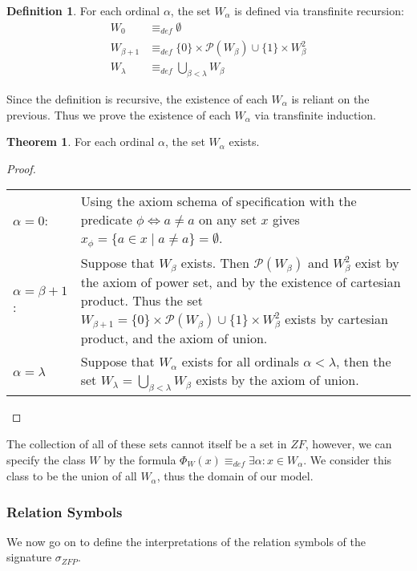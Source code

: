 \documentclass[11pt]{article}
\newcommand{\eqdef}{\equiv_\mathit{def}}
\theoremstyle{definition}
\theoremstyle{theorem}
\theoremstyle{lemma}
\newtheorem{definition}{Definition}[section]
\newtheorem{theorem}{Theorem}[section]
\begin{document}
\begin{definition} For each ordinal $\alpha$, the set $W_\alpha$ is defined via transfinite recursion:
\begin{align*}
 W_0 &\eqdef \emptyset\\
 W_{\beta+1} &\eqdef \{0\}\times\mathcal{P}(W_\beta) \cup \{1\}\times W_\beta^2 \\
 W_\lambda &\eqdef \bigcup_{\beta < \lambda} W_\beta
\end{align*}
\end{definition}
\noindent
Since the definition is recursive, the existence of each $W_\alpha$ is reliant on the previous. Thus we prove the existence of each $W_\alpha$ via transfinite induction.

\begin{theorem} For each ordinal $\alpha$, the set $W_\alpha$ exists.
  \begin{proof} \hspace\\
    \begin{tabular}{p{20mm} p{10cm}}
      $\alpha = 0$: \rule{0pt}{4ex} &
      Using the axiom schema of specification with the predicate $\phi \Leftrightarrow a \neq a$ on any set $x$ gives $x_\phi = \{a \in x \mid a \neq a \} = \emptyset$. \\
      $\alpha = \beta+1$: \rule{0pt}{4ex} &
      Suppose that $W_\beta$ exists. Then $\mathcal{P}(W_\beta)$ and $W_\beta^2$ exist by the axiom of power set, and by the existence of cartesian product. Thus the set $W_{\beta+1} = \{0\}\times\mathcal{P}(W_\beta) \cup \{1\}\times W_\beta^2$ exists by cartesian product, and the axiom of union. \\

      $\alpha = \lambda$ \rule{0pt}{4ex} &
      Suppose that $W_\alpha$ exists for all ordinals $\alpha<\lambda$, then the set $W_\lambda = \bigcup_{\beta < \lambda} W_\beta$ exists by the axiom of union.
    \end{tabular}
  \end{proof}
\end{theorem}
\noindent
The collection of all of these sets cannot itself be a set in $\mathit{ZF}$, however, we can specify the class $W$ by the formula $\Phi_W(x) \eqdef \exists \alpha: x\in W_\alpha$.
We consider this class to be the union of all $W_\alpha$, thus the domain of our model.

\subsubsection{Relation Symbols}
We now go on to define the interpretations of the relation symbols of the signature $\sigma_{\mathit{ZFP}}$.
\end{document}
